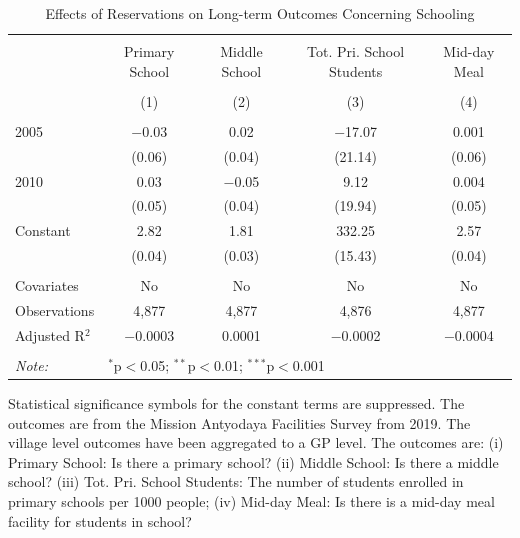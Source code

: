 \begin{table}[!htbp]
\centering
\begin{threeparttable}

  \caption{Effects of Reservations on Long-term Outcomes Concerning Schooling} 
  \label{raj_shrug_schooling_05_10} 
\scriptsize 
\begin{tabular}{@{\extracolsep{0pt}}lcccc} 
\\[-1.8ex]\hline 
\hline \\[-1.8ex] 
 & Primary School & Middle School & Tot. Pri. School Students & Mid-day Meal \\ 
\\[-1.8ex] & (1) & (2) & (3) & (4)\\ 
\hline \\[-1.8ex] 
 2005 & $-$0.03 & 0.02 & $-$17.07 & 0.001 \\ 
  & (0.06) & (0.04) & (21.14) & (0.06) \\ 
  2010 & 0.03 & $-$0.05 & 9.12 & 0.004 \\ 
  & (0.05) & (0.04) & (19.94) & (0.05) \\ 
  Constant & 2.82 & 1.81 & 332.25 & 2.57 \\ 
  & (0.04) & (0.03) & (15.43) & (0.04) \\ 
 \hline \\[-1.8ex] 
Covariates & No & No & No & No \\ 
Observations & 4,877 & 4,877 & 4,876 & 4,877 \\ 
Adjusted R$^{2}$ & $-$0.0003 & 0.0001 & $-$0.0002 & $-$0.0004 \\ 
\hline 
\hline \\[-1.8ex] 
\textit{Note:}  & \multicolumn{4}{l}{$^{*}$p$<$0.05; $^{**}$p$<$0.01; $^{***}$p$<$0.001} \\ 
\end{tabular} 
\begin{tablenotes}[flushleft]
\scriptsize
\item[] Statistical significance symbols for the constant terms are suppressed. The outcomes are from the Mission Antyodaya Facilities Survey from 2019.
                     The village level outcomes have been aggregated to a GP level.
                     The outcomes are:
                         (i) Primary School: Is there a primary school?
                         (ii) Middle School: Is there a middle school?
                         (iii) Tot. Pri. School Students: The number of students enrolled in primary schools per 1000 people;
                         (iv) Mid-day Meal: Is there is a mid-day meal facility for students in school?
\end{tablenotes}
\end{threeparttable}
\end{table}
